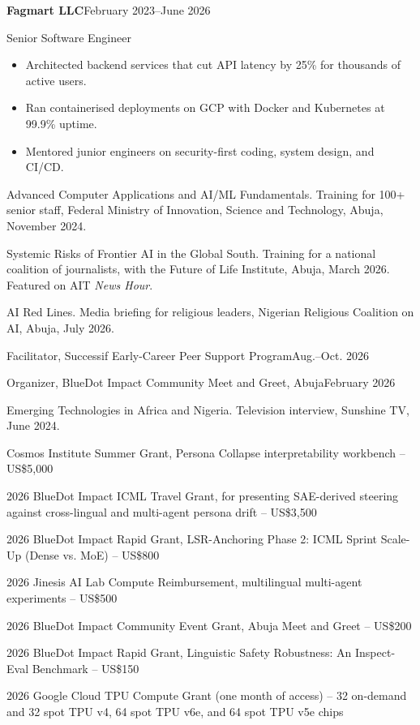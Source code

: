 \documentclass[11pt,letterpaper]{article}
\newlength{\cvindent}
\newcommand{\cvsection}[1]{%
  \par\addvspace{6.5pt}%
  \noindent\hspace*{-\cvindent}%
  \makebox[\cvindent][l]{\smash{\parbox[t]{\cvindent}{\raggedright\bfseries #1}}}%
  \ignorespaces}
\newcommand{\entrygap}{\par\vspace{3pt}}
\newcommand{\dated}[2]{\textbf{#1}\hfill #2\par}
\begin{document}
\cvsection{Industry\\Experience}%
\dated{Fagmart LLC}{February 2023--June 2026}
Senior Software Engineer
\begin{itemize}
  \item Architected backend services that cut API latency by 25\% for thousands of active users.
  \item Ran containerised deployments on GCP with Docker and Kubernetes at 99.9\% uptime.
  \item Mentored junior engineers on security-first coding, system design, and CI/CD.
\end{itemize}

\cvsection{Teaching \&\\Facilitation}%
Advanced Computer Applications and AI/ML Fundamentals. Training for 100+ senior staff, Federal Ministry of Innovation, Science and Technology, Abuja, November 2024.
\entrygap
Systemic Risks of Frontier AI in the Global South. Training for a national coalition of journalists, with the Future of Life Institute, Abuja, March 2026. Featured on AIT \textit{News Hour}.
\entrygap
AI Red Lines. Media briefing for religious leaders, Nigerian Religious Coalition on AI, Abuja, July 2026.
\entrygap
Facilitator, Successif Early-Career Peer Support Program\hfill Aug.--Oct. 2026\par
\entrygap
Organizer, BlueDot Impact Community Meet and Greet, Abuja\hfill February 2026\par

\cvsection{Media}%
Emerging Technologies in Africa and Nigeria. Television interview, Sunshine TV, June 2024.

\cvsection{Awards}%
2026 Cosmos Institute Summer Grant, Persona Collapse interpretability workbench -- US\$5,000
\par
2026 BlueDot Impact ICML Travel Grant, for presenting SAE-derived steering against cross-lingual and multi-agent persona drift -- US\$3,500
\par
2026 BlueDot Impact Rapid Grant, LSR-Anchoring Phase 2: ICML Sprint Scale-Up (Dense vs. MoE) -- US\$800
\par
2026 Jinesis AI Lab Compute Reimbursement, multilingual multi-agent experiments -- US\$500
\par
2026 BlueDot Impact Community Event Grant, Abuja Meet and Greet -- US\$200
\par
2026 BlueDot Impact Rapid Grant, Linguistic Safety Robustness: An Inspect-Eval Benchmark -- US\$150
\par
2026 Google Cloud TPU Compute Grant (one month of access) -- 32 on-demand and 32 spot TPU v4, 64 spot TPU v6e, and 64 spot TPU v5e chips
\end{document}
